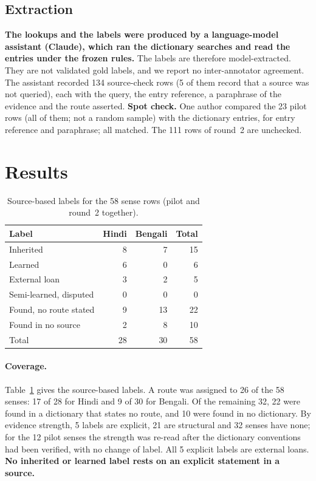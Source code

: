 \documentclass[11pt]{article}
\begin{document}
\subsection{Extraction}
\label{sec:extraction}

\textbf{The lookups and the labels were produced by a language-model assistant (Claude), which ran the dictionary searches and read the entries under the frozen rules.} The labels are therefore model-extracted. They are not validated gold labels, and we report no inter-annotator agreement. The assistant recorded 134 source-check rows (5 of them record that a source was not queried), each with the query, the entry reference, a paraphrase of the evidence and the route asserted. \textbf{Spot check.} One author compared the 23 pilot rows (all of them; not a random sample) with the dictionary entries, for entry reference and paraphrase; all matched. The 111 rows of round~2 are unchecked.

\section{Results}

\begin{table}[t]
\centering\small
\begin{tabular}{lrrr}
\toprule
\textbf{Label} & \textbf{Hindi} & \textbf{Bengali} & \textbf{Total} \\
\midrule
Inherited & 8 & 7 & 15 \\
Learned & 6 & 0 & 6 \\
External loan & 3 & 2 & 5 \\
Semi-learned, disputed & 0 & 0 & 0 \\
\midrule
Found, no route stated & 9 & 13 & 22 \\
Found in no source & 2 & 8 & 10 \\
\midrule
Total & 28 & 30 & 58 \\
\bottomrule
\end{tabular}
\caption{Source-based labels for the 58 sense rows (pilot and round~2 together).}
\label{tab:labels}
\end{table}

\paragraph{Coverage.} Table~\ref{tab:labels} gives the source-based labels. A route was assigned to 26 of the 58 senses: 17 of 28 for Hindi and 9 of 30 for Bengali. Of the remaining 32, 22 were found in a dictionary that states no route, and 10 were found in no dictionary. By evidence strength, 5 labels are explicit, 21 are structural and 32 senses have none; for the 12 pilot senses the strength was re-read after the dictionary conventions had been verified, with no change of label. All 5 explicit labels are external loans. \textbf{No inherited or learned label rests on an explicit statement in a source.}
\end{document}
